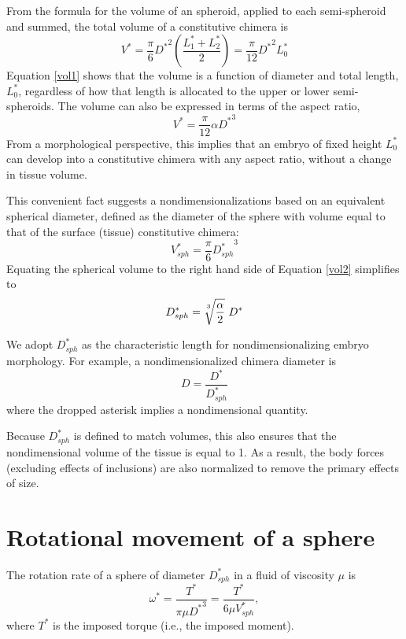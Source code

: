 \documentclass[10pt,a4paper]{article}
\begin{document}
From the formula for the volume of an spheroid, applied to each semi-spheroid and summed, the total volume of a constitutive chimera is
\begin{equation}\label{vol1}
	V^* = \frac{\pi}{6} {D^*}^2 \left(\frac{L_1^*+L_2^*}{2}\right) = \frac{\pi}{12} {D^*}^2 L_0^*
\end{equation} 
Equation \ref{vol1} shows that the volume is a function of diameter and total length, $L_0^*$, regardless of how that length is allocated to the upper or lower semi-spheroids.
The volume can also be expressed in terms of the aspect ratio,
\begin{equation}\label{vol2}
	V^* = \frac{\pi}{12} \alpha {D^*}^3
\end{equation} 
From a morphological perspective, this implies that an embryo of fixed height $L_0^*$ can develop into a constitutive chimera with any aspect ratio, without a change in tissue volume. 

This convenient fact suggests a nondimensionalizations based on an equivalent spherical diameter, defined as the diameter of the sphere with volume equal to that of the surface (tissue) constitutive chimera:
\begin{equation}\label{equivsphere}
	V_{sph}^* = \frac{\pi}{6} {D_{sph}^*}^3
\end{equation} 
Equating the spherical volume to the right hand side of Equation \ref{vol2} simplifies to
\begin{equation}\label{equivD}
	D_{sph}^* = \sqrt[\uproot{5}3]{\frac{\alpha}{2}} ~ D^*
\end{equation} 

We adopt $D_{sph}^*$ as the characteristic length for nondimensionalizing embryo morphology.
For example, a nondimensionalized chimera diameter is
\begin{equation}\label{ndD}
	D = \frac{D^*}{D_{sph}^*}
\end{equation} 
where the dropped asterisk implies a nondimensional quantity.

Because $D_{sph}^*$ is defined to match volumes, this also ensures that the nondimensional volume of the tissue is equal to 1.
As a result, the body forces (excluding effects of inclusions) are also normalized to remove the primary effects of size.


\section{Rotational movement of a sphere}\label{RotSect}
The rotation rate of a sphere of diameter $D_{sph}^*$ in a fluid of viscosity $\mu$ is 
\begin{equation}\label{rot1}
	\omega^* = \frac{T^*}{\pi \mu {D^*}^3} = \frac{T^*}{6 \mu V_{sph}^*},	
\end{equation}
where $T^*$ is the imposed torque (i.e., the imposed moment).
\end{document}
